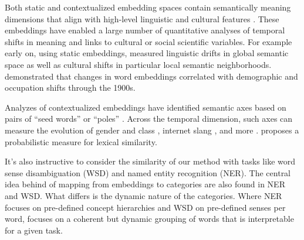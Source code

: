 Both static and contextualized embedding spaces contain semantically meaning dimensions that align with high-level linguistic and cultural features \citep{bolukbasi2016man, DBLP:journals/corr/abs-1906-02715}. These embeddings have enabled a large number of quantitative analyses of temporal shifts in meaning and links to cultural or social scientific variables. For example early on, using static embeddings, \citet{hamilton2016cultural} measured linguistic drifts in global semantic space as well as cultural shifts in particular local semantic neighborhoods. \citet{garg2018word} demonstrated that changes in word embeddings correlated with demographic and occupation shifts through the 1900s.

Analyzes of contextualized embeddings have identified semantic axes based on pairs of ``seed words'' or ``poles'' \citep{soler2020bert, lucy2022discovering, grand2022semantic}. Across the temporal dimension, such axes can measure the evolution of gender and class \citep{kozlowski2019geometry}, internet slang \citep{keidar-etal-2022-slangvolution}, and more \citep{madani2023measuring, lyu2023representation, erk2024adjusting}. \citet{bravzinskas2017embedding} proposes a probabilistic measure for lexical similarity. 

It's also instructive to consider the similarity of our method  with tasks like word sense disambiguation (WSD) and named entity recognition (NER). The central idea behind \wc of mapping from embeddings to categories are also found in NER and WSD. What differs is the dynamic nature of the categories. Where NER focuses on pre-defined concept hierarchies and WSD on pre-defined senses per word,  \wc  focuses on a coherent but dynamic grouping of words that is interpretable for a given task.














